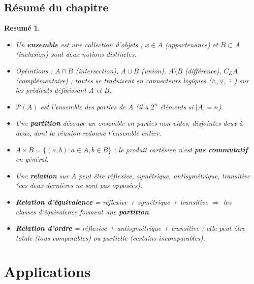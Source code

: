 \documentclass[a4paper,12pt,openany]{book}
\providecommand{\og}{\guillemotleft~}
\providecommand{\fg}{\ifhmode~\fi\guillemotright}
\newtheorem{application}{Application}[section]
\newtheorem{resume}{Resumé}[section]
\begin{document}
%
\section{Résumé du chapitre}

\begin{resume}
\begin{itemize}
  \item Un \textbf{ensemble} est une collection d'objets ; $x \in A$
  (appartenance) et $B \subset A$ (inclusion) sont deux notions distinctes.
  \item Opérations : $A\cap B$ (intersection), $A\cup B$ (union), $A\setminus
  B$ (différence), $C_E A$ (complémentaire) ; toutes se traduisent en
  connecteurs logiques ($\wedge,\vee,\overline{\ \cdot\ }$) sur les prédicats
  définissant $A$ et $B$.
  \item $\mathcal{P}(A)$ est l'ensemble des parties de $A$ (il a $2^n$
  éléments si $|A|=n$).
  \item Une \textbf{partition} découpe un ensemble en parties non vides,
  disjointes deux à deux, dont la réunion redonne l'ensemble entier.
  \item $A \times B = \{(a,b) : a\in A, b\in B\}$ : le produit cartésien
  n'est \textbf{pas commutatif} en général.
  \item Une \textbf{relation} sur $A$ peut être réflexive, symétrique,
  antisymétrique, transitive (ces deux dernières ne sont pas opposées).
  \item \textbf{Relation d'équivalence} = réflexive + symétrique +
  transitive $\Rightarrow$ les classes d'équivalence forment une
  \textbf{partition}.
  \item \textbf{Relation d'ordre} = réflexive + antisymétrique + transitive ;
  elle peut être totale (tous comparables) ou partielle (certains
  incomparables).
\end{itemize}
\end{resume}


\chapter{Applications}
\end{document}
